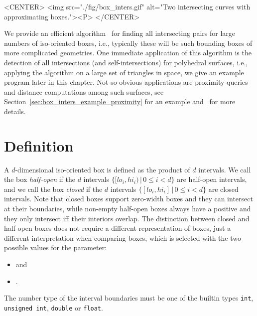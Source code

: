 \begin{ccHtmlOnly}
    <CENTER>
        <img src="./fig/box_inters.gif" alt="Two intersecting curves with
        approximating boxes."><P>
    </CENTER>
\end{ccHtmlOnly}

We provide an efficient algorithm~\cite{cgal:ze-fsbi-02} for finding all
intersecting pairs for large numbers of iso-oriented boxes, i.e.,
typically these will be such bounding boxes of more complicated geometries.
One immediate application of this algorithm is the detection of all
intersections (and self-intersections) for polyhedral surfaces, i.e.,
applying the algorithm on a large set of triangles in space, we give
an example program later in this chapter. Not so obvious applications
are proximity queries and distance computations among such surfaces,
see Section~\ref{sec:box_inters_example_proximity} for an example
and~\cite{cgal:ze-fsbi-02} for more details.  

\section{Definition}\label{sec:box-inters-def}

A $d$-dimensional iso-oriented box is defined as the
 product of $d$ intervals. We call the
box \emph{half-open} if the $d$ intervals $\{ [lo_i,hi_i) \,|\, 0 \leq
i < d\}$ are half-open intervals, and we call the box \emph{closed} if
the $d$ intervals $\{ [lo_i,hi_i] \,|\, 0 \leq i < d\}$ are closed
intervals. Note that closed boxes support zero-width boxes and they
can intersect at their boundaries, while non-empty half-open boxes
always have a positive  and they only intersect iff their
interiors overlap.  The distinction between closed and half-open boxes
does not require a different representation of boxes, just a different
interpretation when comparing boxes, which is selected with the two
possible values for the  parameter:

\begin{itemize}
  \item {} and
  \item {}.
\end{itemize}

The number type of the interval boundaries must be one of the builtin
types \texttt{int}, \texttt{unsigned int}, \texttt{double} or
\texttt{float}.

